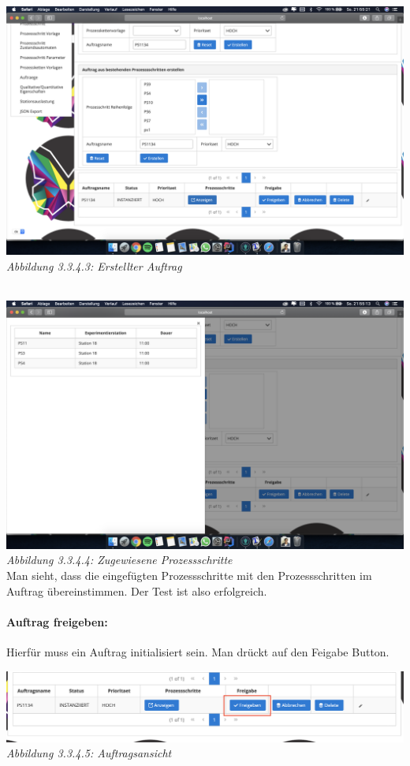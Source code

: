\documentclass[enabledeprecatedfontcommands,fontsize=12pt,paper=a4,twoside]{scrartcl}
\begin{document}
\hypertarget{sc3.3.4.3}{
\includegraphics[width=1\textwidth]{Screenshots/3343.png}
\textit{Abbildung 3.3.4.3: Erstellter Auftrag}
} \\

\hypertarget{sc3.3.4.4}{
\includegraphics[width=1\textwidth]{Screenshots/3344.png}
\textit{Abbildung 3.3.4.4: Zugewiesene Prozessschritte}
} \\

Man sieht, dass die eingefügten Prozessschritte mit den Prozessschritten im Auftrag übereinstimmen. 
Der Test ist also erfolgreich.

\paragraph{Auftrag freigeben:}

Hierfür muss ein Auftrag initialisiert sein. Man drückt auf den Feigabe Button.

\hypertarget{sc3.3.4.5}{
\includegraphics[width=1\textwidth]{Screenshots/3345.png}
\textit{Abbildung 3.3.4.5: Auftragsansicht}
} \\
\end{document}
